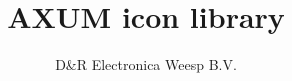 \documentclass[a4paper]{report}
\begin{document}
\title{AXUM icon library}
\author{D\&R Electronica Weesp B.V.}
\maketitle

\setcounter{tocdepth}{1}
\tableofcontents
\setcounter{tocdepth}{2}





\end{document}
